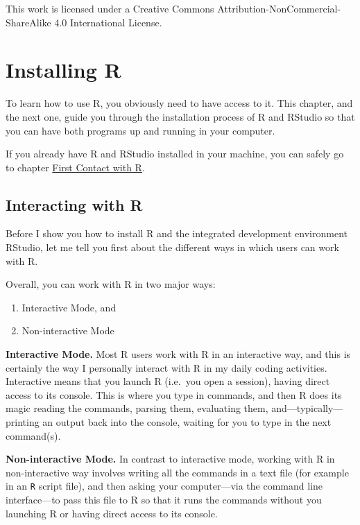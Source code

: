 \documentclass[
]{book}
\begin{document}
This work is licensed under a Creative Commons Attribution-NonCommercial-ShareAlike 4.0 International License.

\hypertarget{installing-r}{%
\chapter{Installing R}\label{installing-r}}

To learn how to use R, you obviously need to have access to it. This chapter,
and the next one, guide you through the installation process of R and RStudio
so that you can have both programs up and running in your computer.

If you already have R and RStudio installed in your machine, you can safely
go to chapter \protect\hyperlink{rintro}{First Contact with R}.

\hypertarget{interacting-with-r}{%
\section{Interacting with R}\label{interacting-with-r}}

Before I show you how to install R and the integrated development environment
RStudio, let me tell you first about the different ways in which users can
work with R.

Overall, you can work with R in two major ways:

\begin{enumerate}
\def\labelenumi{\arabic{enumi})}
\item
  Interactive Mode, and
\item
  Non-interactive Mode
\end{enumerate}

\textbf{Interactive Mode.} Most R users work with R in an interactive way, and this
is certainly the way I personally interact with R in my daily coding activities.
Interactive means that you launch R (i.e.~you open a session), having direct
access to its console. This is where you type in commands, and then R does its
magic reading the commands, parsing them, evaluating them,
and---typically---printing an output back into the console, waiting for you to
type in the next command(s).

\textbf{Non-interactive Mode.} In contrast to interactive mode, working with R in
non-interactive way involves writing all the commands in a text file (for
example in an \texttt{R} script file), and then asking your computer---via the
command line interface---to pass this file to R so that it runs the
commands without you launching R or having direct access to its console.
\end{document}
